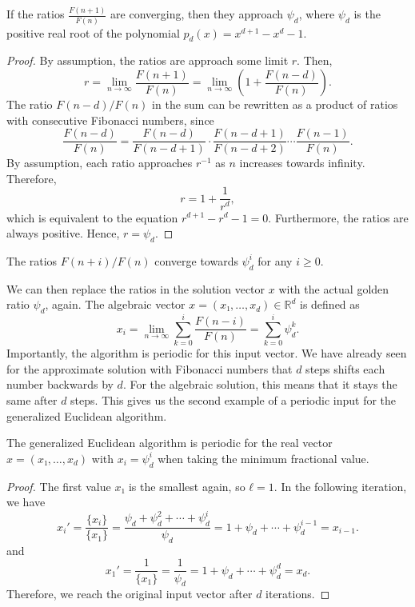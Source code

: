 \begin{theorem}
  If the ratios $\frac{F(n+1)}{F(n)}$ are converging, then they approach $ψ_d$,
  where $ψ_d$ is the positive real root of the polynomial $p_d(x) = x^{d+1} - x^d - 1$.
\end{theorem}

\begin{proof}
  By assumption, the ratios are approach some limit $r$.
  Then,
  \[
    r
    = \lim_{n → ∞} \frac{F(n+1)}{F(n)}
    = \lim_{n → ∞} \left(1 + \frac{F(n-d)}{F(n)}\right).
  \]
  The ratio $F(n-d)/F(n)$ in the sum can be rewritten as a product of ratios with
  consecutive Fibonacci numbers, since
  \[
    \frac{F(n - d)}{F(n)}
    = \frac{F(n - d)}{F(n - d + 1)} · \frac{F(n - d + 1)}{F(n - d + 2)} ⋯ \frac{F(n - 1)}{F(n)}.
  \]
  By assumption, each ratio approaches $r^{-1}$ as $n$ increases towards infinity.
  Therefore,
  \[
    r = 1 + \frac{1}{r^d},
  \]
  which is equivalent to the equation $r^{d+1} - r^d - 1 = 0$.
  Furthermore, the ratios are always positive.
  Hence, $r = ψ_d$.
\end{proof}

\begin{corollary}
  The ratios $F(n + i)/F(n)$ converge towards $ψ_d^i$ for any $i ≥ 0$.
\end{corollary}

We can then replace the ratios in the solution vector $x$ with the actual
golden ratio $ψ_d$, again.
The algebraic vector $x = (x₁, …, x_d) ∈ ℝ^d$ is defined as
\[
  x_i
  = \lim_{n → ∞} \sum_{k=0}^i \frac{F(n - i)}{F(n)}
  = \sum_{k=0}^i ψ_d^k.
\]
Importantly, the algorithm is periodic for this input vector.
We have already seen for the approximate solution with Fibonacci numbers
that $d$ steps shifts each number backwards by $d$.
For the algebraic solution, this means that it stays the same after $d$ steps.
This gives us the second example of a periodic input for the generalized Euclidean algorithm.

\begin{theorem}
  The generalized Euclidean algorithm is periodic for the real vector $x = (x₁, …, x_d)$
  with $x_i = ψ_d^i$ when taking the minimum fractional value.
\end{theorem}

\begin{proof}
  The first value $x₁$ is the smallest again, so $ℓ = 1$.
  In the following iteration, we have
  \[
    x_i' = \frac{\{x_i\}}{\{x_1\}} = \frac{ψ_d + ψ_d^2 + ⋯ + ψ_d^i}{ψ_d} = 1 + ψ_d + ⋯ + ψ_d^{i-1} = x_{i-1}.
  \]
  and
  \[
    x_1' = \frac{1}{\{x_1\}} = \frac{1}{ψ_d} = 1 + ψ_d + ⋯ + ψ_d^d = x_d.
  \]
  Therefore, we reach the original input vector after $d$ iterations.
\end{proof}

